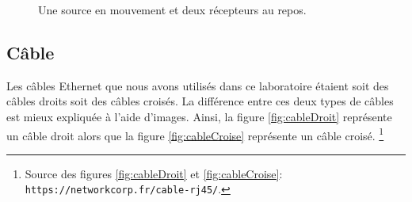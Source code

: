 \documentclass[a4paper]{article}
\begin{document}
\begin{center}
\begin{figure}[H]
        \caption{Une source en mouvement et deux récepteurs au repos.}
        \label{fig:dopplerMouvement}
    \end{figure}
\end{center}










\subsection{Câble} \label{subsec:cables}





Les câbles Ethernet que nous avons utilisés dans ce laboratoire étaient soit des câbles droits soit des câbles croisés. La différence entre ces deux types de câbles est mieux expliquée à l'aide d'images. Ainsi, la figure \ref{fig:cableDroit} représente un câble droit alors que la figure \ref{fig:cableCroise} représente un câble croisé.
\footnote{Source des figures \ref{fig:cableDroit} et \ref{fig:cableCroise}: \texttt{https://networkcorp.fr/cable-rj45/}.}
\end{document}
